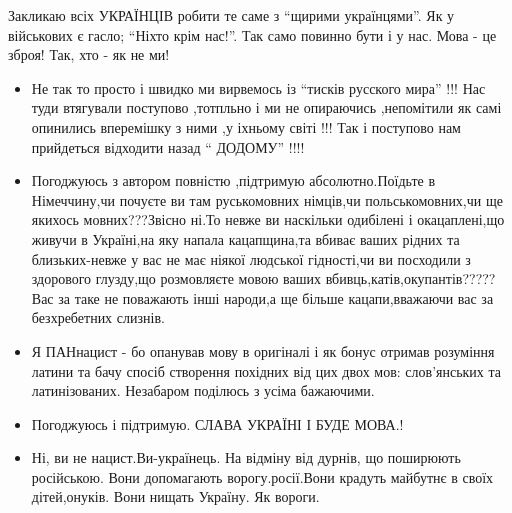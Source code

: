 Закликаю всіх УКРАЇНЦІВ робити те саме з \enquote{щирими українцями}. Як у військових є
гасло; \enquote{Ніхто крім нас!}. Так само повинно бути і у нас. Мова - це зброя! Так,
хто - як не ми!

\begin{itemize}
\item {}
Не так то просто і швидко ми вирвемось із \enquote{тисків русского мира} !!! Нас туди
втягували поступово ,тотпльно і ми не опираючись ,непомітили як
самі опинились вперемішку з ними ,у іхньому світі !!! Так і
поступово нам прийдеться відходити назад \enquote{ ДОДОМУ} !!!!

\item {}
Погоджуюсь з автором повністю ,підтримую абсолютно.Поїдьте в Німеччину,чи почуєте ви там руськомовних німців,чи польськомовних,чи ще якихось мовних???Звісно ні.То невже ви наскільки одибілені і окацаплені,що живучи в Україні,на яку напала кацапщина,та вбиває ваших рідних та близьких-невже у вас не має ніякої людської гідності,чи ви посходили з здорового глузду,що розмовляєте мовою ваших вбивць,катів,окупантів?????Вас за таке не поважають інші народи,а ще більше кацапи,вважаючи вас за безхребетних слизнів.

\item {}
Я ПАНнацист - бо опанував мову в оригіналі і як бонус отримав розуміння латини та бачу спосіб створення похідних від цих двох мов: слов'янських та латинізованих.
Незабаром поділюсь з усіма бажаючими.

\item {}
Погоджуюсь і підтримую. СЛАВА УКРАЇНІ І БУДЕ МОВА.!

\item {}
Ні, ви не нацист.Ви-українець. На відміну від дурнів, що поширюють російською.
Вони допомагають ворогу.росії.Вони крадуть майбутнє в своїх
дітей,онуків. Вони нищать Україну. Як вороги.
\end{itemize}
